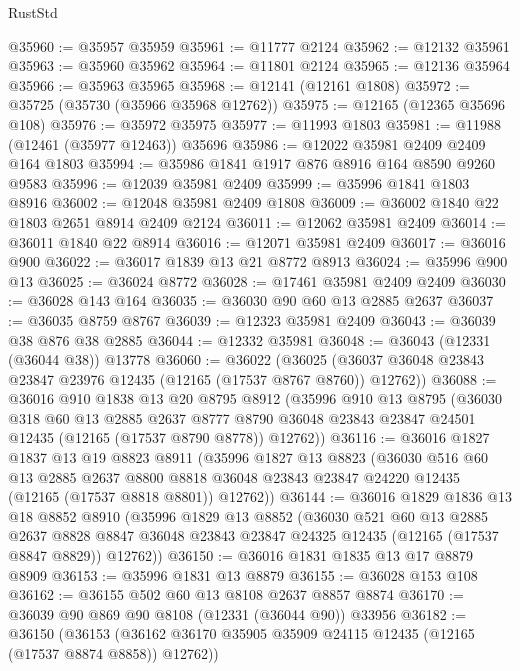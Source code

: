 \begin{lexlean}{RustStd}
\begin{coremodule}
@35960 := @35957 @35959
@35961 := @11777 @2124
@35962 := @12132 @35961
@35963 := @35960 @35962
@35964 := @11801 @2124
@35965 := @12136 @35964
@35966 := @35963 @35965
@35968 := @12141 (@12161 @1808)
@35972 := @35725 (@35730 (@35966 @35968 @12762))
@35975 := @12165 (@12365 @35696 @108)
@35976 := @35972 @35975
@35977 := @11993 @1803
@35981 := @11988 (@12461 (@35977 @12463)) @35696
@35986 := @12022 @35981 @2409 @2409 @164 @1803
@35994 := @35986 @1841 @1917 @876 @8916 @164 @8590 @9260 @9583
@35996 := @12039 @35981 @2409
@35999 := @35996 @1841 @1803 @8916
@36002 := @12048 @35981 @2409 @1808
@36009 := @36002 @1840 @22 @1803 @2651 @8914 @2409 @2124
@36011 := @12062 @35981 @2409
@36014 := @36011 @1840 @22 @8914
@36016 := @12071 @35981 @2409
@36017 := @36016 @900
@36022 := @36017 @1839 @13 @21 @8772 @8913
@36024 := @35996 @900 @13
@36025 := @36024 @8772
@36028 := @17461 @35981 @2409 @2409
@36030 := @36028 @143 @164
@36035 := @36030 @90 @60 @13 @2885 @2637
@36037 := @36035 @8759 @8767
@36039 := @12323 @35981 @2409
@36043 := @36039 @38 @876 @38 @2885
@36044 := @12332 @35981
@36048 := @36043 (@12331 (@36044 @38)) @13778
@36060 := @36022
    (@36025 (@36037 @36048 @23843 @23847 @23976 @12435 (@12165 (@17537 @8767 @8760)) @12762))
@36088 := @36016
    @910
    @1838
    @13
    @20
    @8795
    @8912
    (@35996
      @910
      @13
      @8795
      (@36030
        @318
        @60
        @13
        @2885
        @2637
        @8777
        @8790
        @36048
        @23843
        @23847
        @24501
        @12435
        (@12165 (@17537 @8790 @8778))
        @12762))
@36116 := @36016
    @1827
    @1837
    @13
    @19
    @8823
    @8911
    (@35996
      @1827
      @13
      @8823
      (@36030
        @516
        @60
        @13
        @2885
        @2637
        @8800
        @8818
        @36048
        @23843
        @23847
        @24220
        @12435
        (@12165 (@17537 @8818 @8801))
        @12762))
@36144 := @36016
    @1829
    @1836
    @13
    @18
    @8852
    @8910
    (@35996
      @1829
      @13
      @8852
      (@36030
        @521
        @60
        @13
        @2885
        @2637
        @8828
        @8847
        @36048
        @23843
        @23847
        @24325
        @12435
        (@12165 (@17537 @8847 @8829))
        @12762))
@36150 := @36016 @1831 @1835 @13 @17 @8879 @8909
@36153 := @35996 @1831 @13 @8879
@36155 := @36028 @153 @108
@36162 := @36155 @502 @60 @13 @8108 @2637 @8857 @8874
@36170 := @36039 @90 @869 @90 @8108 (@12331 (@36044 @90)) @33956
@36182 := @36150
    (@36153 (@36162 @36170 @35905 @35909 @24115 @12435 (@12165 (@17537 @8874 @8858)) @12762))

\end{coremodule}
\end{lexlean}
